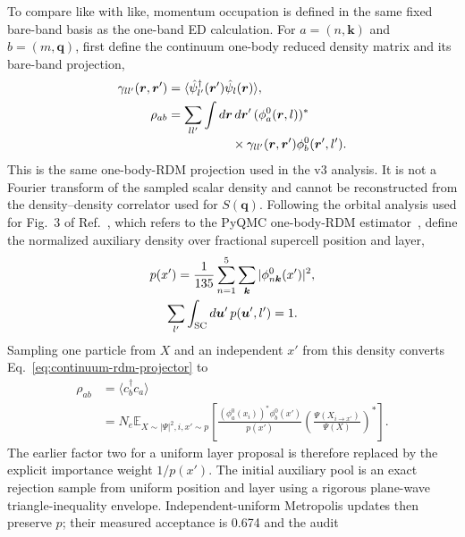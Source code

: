 To compare like with like, momentum occupation is defined in the same fixed
bare-band basis as the one-band ED calculation. For
$a=(n,\bm k)$ and $b=(m,\bm q)$, first define the continuum one-body reduced
density matrix and its bare-band projection,
\begin{align}
 \gamma_{ll'}(\bm r,\bm r')&=
 \langle\hat\psi_{l'}^\dagger(\bm r')
 \hat\psi_l(\bm r)\rangle,\\
 \rho_{ab}&=\sum_{ll'}\int d\bm r\,d\bm r'\,
 (\phi_a^0(\bm r,l))^*\nonumber\\[-2pt]
 &\hspace{18mm}\times\gamma_{ll'}(\bm r,\bm r')
 \phi_b^0(\bm r',l').
\label{eq:continuum-rdm-projector}
\end{align}
This is the same one-body-RDM projection used in the v3 analysis. It is not a
Fourier transform of the sampled scalar density and cannot be reconstructed
from the density--density correlator used for $S(\bm q)$. Following the
orbital analysis used for Fig.~3 of Ref.~\cite{limomentum}, which refers to
the PyQMC one-body-RDM estimator~\cite{pyqmc}, define the normalized auxiliary
density over fractional supercell position and layer,
\begin{equation}
\begin{gathered}
 p(x')=\frac{1}{135}\sum_{n=1}^{5}\sum_{\bm k}
       |\phi^0_{n\bm k}(x')|^2,\\
 \sum_{l'}\int_{\rm SC}d\bm u'\,p(\bm u',l')=1 .
\end{gathered}
\label{eq:orbital-mixture-density}
\end{equation}
Sampling one particle from $X$ and an independent $x'$ from this density
converts Eq.~\eqref{eq:continuum-rdm-projector} to
\begin{equation}
\begin{split}
 \rho_{ab}&=\langle c_b^\dagger c_a\rangle\\
 &=N_e\mathbb E_{X\sim|\Psi|^2,i,x'\sim p}\!\left[
 \frac{(\phi_a^0(x_i))^*\phi_b^0(x')}{p(x')}
 \left(\frac{\Psi(X_{i\to x'})}{\Psi(X)}\right)^*\right].
\end{split}
\label{eq:rdmratio}
\end{equation}
The earlier factor two for a uniform layer proposal is therefore replaced by
the explicit importance weight $1/p(x')$. The initial auxiliary pool is an
exact rejection sample from uniform position and layer using a rigorous
plane-wave triangle-inequality envelope. Independent-uniform Metropolis
updates then preserve $p$; their measured acceptance is 0.674 and the audit
